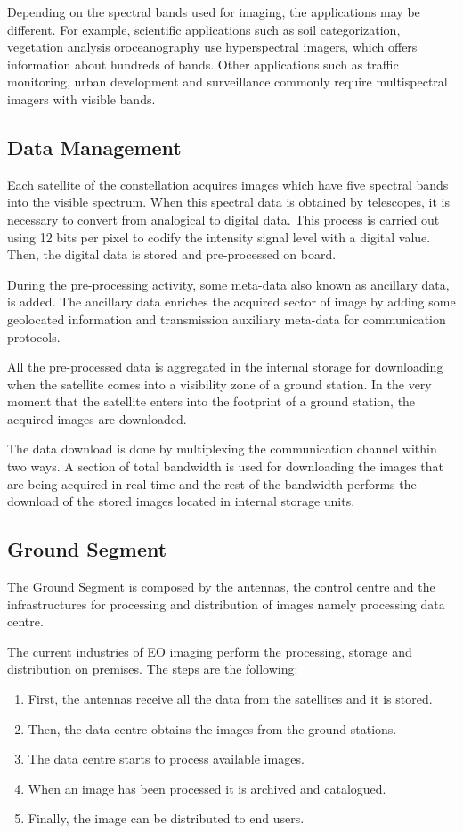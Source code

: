 Depending on the spectral bands used for imaging, the applications may be
different. For example, scientific applications such as soil categorization,
vegetation analysis oroceanography use hyperspectral imagers, which offers
information about hundreds of bands. Other applications such as traffic monitoring,
urban development and surveillance commonly require multispectral imagers with visible bands.

\subsection{Data Management}

Each satellite of the constellation acquires images which have five spectral
bands into the visible spectrum. When this spectral data is
obtained by telescopes, it is necessary to convert from analogical to digital
data. This process is carried out using 12 bits per pixel to codify the
intensity signal level with a digital value. Then, the digital data is stored and pre-processed on
board. 

During the pre-processing activity, some meta-data also known as ancillary
data, is added. The ancillary data enriches the acquired sector of image by adding
some geolocated information and transmission auxiliary meta-data for communication
protocols. 

All the pre-processed data is aggregated in the
internal storage for downloading when the satellite comes into a visibility zone
of a ground station. In the very moment that the satellite enters into the footprint of a
ground station, the acquired images are downloaded. 

The data download is done by multiplexing the
communication channel within two ways. A section of total bandwidth
is used for downloading the images that are being acquired in real time and the
rest of the bandwidth performs the download of the stored images located in
internal storage units.

\subsection{Ground Segment}

The Ground Segment is composed by the antennas, the control centre and the
infrastructures for processing and distribution of images namely processing
data centre. 

The current industries of \ac{EO} imaging perform the processing, storage and distribution on premises. The steps are the following:
\begin{enumerate}
\item First, the antennas receive all the data from the satellites and it is stored.
\item Then, the data centre obtains the images from the ground stations.
\item The data centre starts to process available images.
\item When an image has been processed it is archived and catalogued. 
\item Finally, the image can be distributed to end users.
\end{enumerate}

